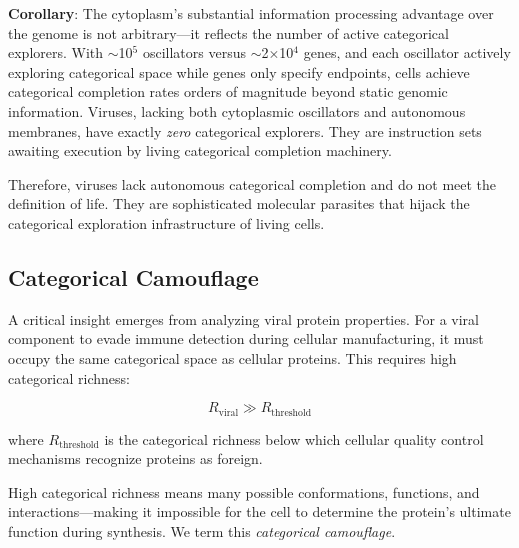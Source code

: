 \documentclass[11pt]{article}
\begin{document}
\textbf{Corollary}: The cytoplasm's substantial information processing advantage over the genome is not arbitrary—it reflects the number of active categorical explorers. With $\sim$10$^5$ oscillators versus $\sim$2$\times$10$^4$ genes, and each oscillator actively exploring categorical space while genes only specify endpoints, cells achieve categorical completion rates orders of magnitude beyond static genomic information. Viruses, lacking both cytoplasmic oscillators and autonomous membranes, have exactly \textit{zero} categorical explorers. They are instruction sets awaiting execution by living categorical completion machinery.

Therefore, viruses lack autonomous categorical completion and do not meet the definition of life. They are sophisticated molecular parasites that hijack the categorical exploration infrastructure of living cells.

\subsection{Categorical Camouflage}

A critical insight emerges from analyzing viral protein properties. For a viral component to evade immune detection during cellular manufacturing, it must occupy the same categorical space as cellular proteins. This requires high categorical richness:

\begin{equation}
R_{\text{viral}} \gg R_{\text{threshold}}
\end{equation}

where $R_{\text{threshold}}$ is the categorical richness below which cellular quality control mechanisms recognize proteins as foreign.

High categorical richness means many possible conformations, functions, and interactions—making it impossible for the cell to determine the protein's ultimate function during synthesis. We term this \textit{categorical camouflage}.
\end{document}
